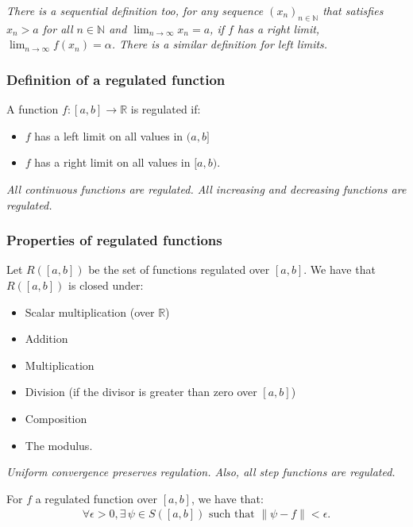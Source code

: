 \documentclass[a4paper, 12pt, twoside]{article}
\begin{document}
\vspace{\baselineskip}

\textit{There is a sequential definition too, for any sequence
      $(x_n)_{n \in \mathbb{N}}$ that satisfies $x_n > a$ for all $n \in \mathbb{N}$
      and $\lim_{n\to\infty} x_n = a$, if $f$ has a right limit,
      $\lim_{n\to\infty}f(x_n) = \alpha$. There is a similar definition for left
      limits.}

\subsubsection{Definition of a regulated function}

A function $f:[a,b]\to\mathbb{R}$ is regulated if:

\begin{itemize}
      \item $f$ has a left limit on all values in $(a, b]$
      \item $f$ has a right limit on all values in $[a, b)$.
\end{itemize}

\textit{All continuous functions are regulated. All increasing and
      decreasing functions are regulated.}

\subsubsection{Properties of regulated functions}

Let $R([a, b])$ be the set of functions regulated over $[a, b]$. We have that
$R([a, b])$ is closed under:

\begin{itemize}
      \item Scalar multiplication (over $\mathbb{R}$)
      \item Addition
      \item Multiplication
      \item Division (if the divisor is greater than zero over $[a, b]$)
      \item Composition
      \item The modulus.
\end{itemize}

\textit{Uniform convergence preserves regulation. Also, all step functions are
      regulated.}

\newpage

For $f$ a regulated function over $[a,b]$, we have that:
\begin{align*}
      \forall \epsilon > 0,\exists\,\psi\in S([a, b]) \text{ such that }
      \|\psi - f\| < \epsilon.
\end{align*}
\end{document}
